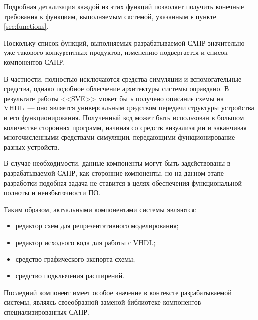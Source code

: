 Подробная детализация каждой из этих функций позволяет получить конечные требования к функциям, выполняемым системой, указанным в пункте \ref{sec:functions}.

Поскольку список функций, выполняемых разрабатываемой САПР значительно уже такового конкурентных продуктов, изменению подвергается и список компонентов САПР.

В частности, полностью исключаются средства симуляции и вспомогательные средства, однако подобное облегчение архитектуры системы оправдано.
В результате работы <<SVE>> может быть получено описание схемы на VHDL~--- оно является универсальным средством передачи структуры устройства и его функционирования.
Полученный код может быть использован в большом количестве сторонних программ, начиная со средств визуализации и заканчивая многочисленными средствами симуляции, передающими функционирование разных устройств.

В случае необходимости, данные компоненты могут быть задействованы в разрабатываемой САПР, как сторонние компоненты, но на данном этапе разработки подобная задача не ставится в целях обеспечения функциональной полноты и неизбыточности ПО.

Таким образом, актуальными компонентами системы являются:
\begin{itemize}
  \item редактор схем для репрезентативного моделирования;
  \item редактор исходного кода для работы с VHDL;
  \item средство графического экспорта схемы;
  \item средство подключения расширений.
\end{itemize}

Последний компонент имеет особое значение в контексте разрабатываемой системы, являясь своеобразной заменой библиотеке компонентов специализированных САПР.